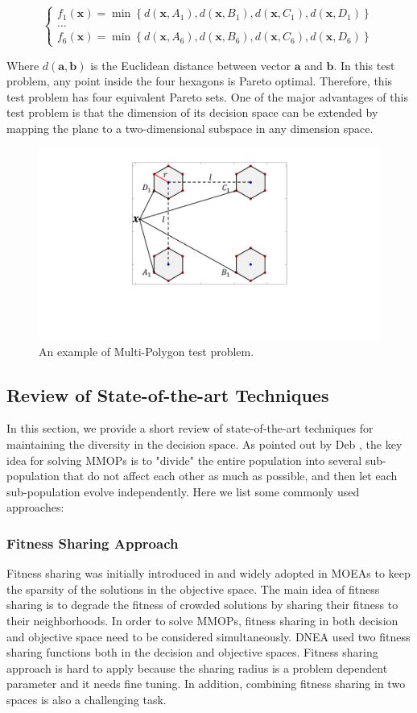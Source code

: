 \documentclass[conference]{IEEEtran}
\begin{document}
\begin{equation*}
\left\{
\begin{array}{c}{f_{1}(\boldsymbol{x})=\min \left\{d\left(\boldsymbol{x}, A_{1}\right), d\left(\boldsymbol{x}, B_{1}\right), d\left(\boldsymbol{x}, C_{1}\right), d\left(\boldsymbol{x}, D_{1}\right)\right\}} \\ \dots \\ {{f_{6}}(\boldsymbol{x})=\min \left\{d\left(\boldsymbol{x}, A_{6}\right), d\left(\boldsymbol{x}, B_{6}\right), d\left(\boldsymbol{x}, C_{6}\right), d\left(\boldsymbol{x}, D_{6}\right)\right\}}\end{array}
\right.
\end{equation*}

Where $d(\boldsymbol{a} ,\boldsymbol{b})$ is the Euclidean distance between vector $\boldsymbol{a}$ and $\boldsymbol{b}$.  In this test problem, any point inside the four hexagons is Pareto optimal. Therefore, this test problem has four equivalent Pareto sets. One of the major advantages of this test problem is that the dimension of its decision space can be extended by mapping the plane to a two-dimensional subspace in any dimension space. 

\begin{figure}[htbp]
	\centering
	\includegraphics[width=.3\textwidth]{Section2/Problem}
	\caption{An example of Multi-Polygon test problem.}
	\label{fig:Multi-Polygon Problem}
\end{figure}

\subsection{Review of State-of-the-art Techniques}
\label{Review of State-of-the-art Techniques}
In this section, we provide a short review of state-of-the-art techniques for maintaining the diversity in the decision space. As pointed out by Deb \cite{Deb2001}, the key idea for solving MMOPs is to "divide" the entire population into several sub-population that do not affect each other as much as possible, and then let each sub-population evolve independently. Here we list some commonly used approaches:
\subsubsection{Fitness Sharing Approach}
Fitness sharing was initially introduced in \cite{Goldberg} and widely adopted in MOEAs to keep the sparsity of the solutions in the objective space. The main idea of fitness sharing is to degrade the fitness of crowded solutions by sharing their fitness to their neighborhoods. In order to solve MMOPs, fitness sharing in both decision and objective space need to be considered simultaneously. DNEA\cite{DNEA} used two fitness sharing functions both in the decision and objective spaces. Fitness sharing approach is hard to apply because the sharing radius is a problem dependent parameter and it needs fine tuning. In addition, combining fitness sharing in two spaces is also a challenging task.
\end{document}
